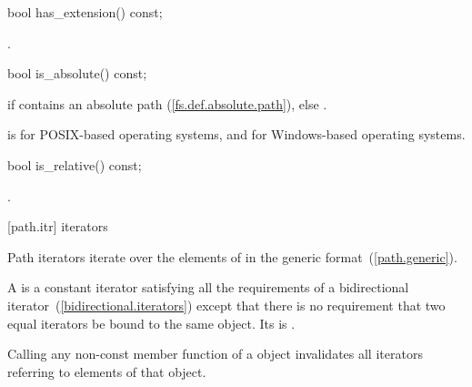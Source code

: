 \begin{itemdecl}
bool has_extension() const;
\end{itemdecl}

\begin{itemdescr}
\pnum
\returns {}.
\end{itemdescr}

\begin{itemdecl}
bool is_absolute() const;
\end{itemdecl}

\begin{itemdescr}
\pnum
\returns {} if 
  contains an absolute path (\ref{fs.def.absolute.path}), else .

\pnum
\begin{example}  is
       for  POSIX-based operating systems, and  for Windows-based
operating systems. \end{example}
\end{itemdescr}

\begin{itemdecl}
bool is_relative() const;
\end{itemdecl}

\begin{itemdescr}
\pnum
\returns {}.
\end{itemdescr}

[path.itr]{ iterators}

\pnum
Path iterators iterate over the elements of 
in the generic format~(\ref{path.generic}).

\pnum
A  is a constant iterator satisfying all the
requirements of a bidirectional iterator~(\ref{bidirectional.iterators})
except that there is no requirement that
two equal iterators be bound to the same object.
Its  is .

\pnum
Calling any non-const member function of a  object
invalidates all iterators referring to elements of that object.

